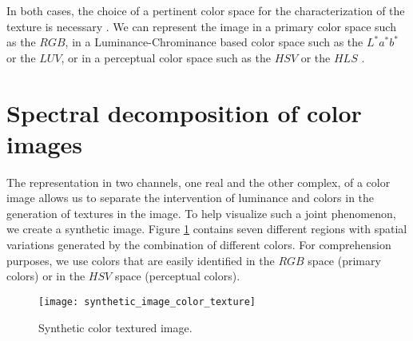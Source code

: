 
In both cases, the choice of a pertinent color space for the characterization of the texture is necessary \citep{Qazi.Alata.ea:PR:2011}. We can represent the image in a primary color space such as the $RGB$, in a Luminance-Chrominance based color space such as the $L^*a^*b^*$ or the $LUV$, or in a perceptual color space such as the $HSV$ or the $HLS$ \citep{Hanbury:IA:2003}. 


\section{Spectral decomposition of color images}

The representation in two channels, one real and the other complex, of a color image allows us to separate the intervention of luminance and colors in the generation of textures in the image. To help visualize such a joint phenomenon, we create a synthetic image. Figure \ref{fig:synthetic_color_texture_image} contains seven different regions with spatial variations generated by the combination of different colors. For comprehension purposes, we use colors that are easily identified in the $RGB$ space (primary colors) or in the $HSV$ space (perceptual colors).

\begin{figure}
    \texttt{[image: synthetic\_image\_color\_texture]}
\caption{Synthetic color textured image.}\label{fig:synthetic_color_texture_image}
\end{figure}

